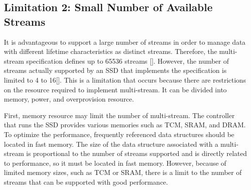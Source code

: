 \subsection{Limitation 2: Small Number of Available Streams}
It is advantageous to support a large number of streams in order to manage data with different lifetime characteristics as distinct streams.
Therefore, the multi-stream specification defines up to 65536 streams [].
However, the number of streams actually supported by an SSD that implements the specification is limited to 4 to 16[].
This is a limitation that occurs because there are restrictions on the resource required to implement multi-stream. It can be divided into memory, power, and overprovision resource.

First, memory resource may limit the number of multi-stream.
The controller that runs the SSD provides various memories such as TCM, SRAM, and DRAM. 
To optimize the performance, frequently referenced data structures should be located in fast memory.
The size of the data structure associated with a multi-stream is proportional to the number of streams supported and is directly related to performance, so it must be located in fast memory.
However, because of limited memory sizes, such as TCM or SRAM,
 there is a limit to the number of streams that can be supported with good performance.

